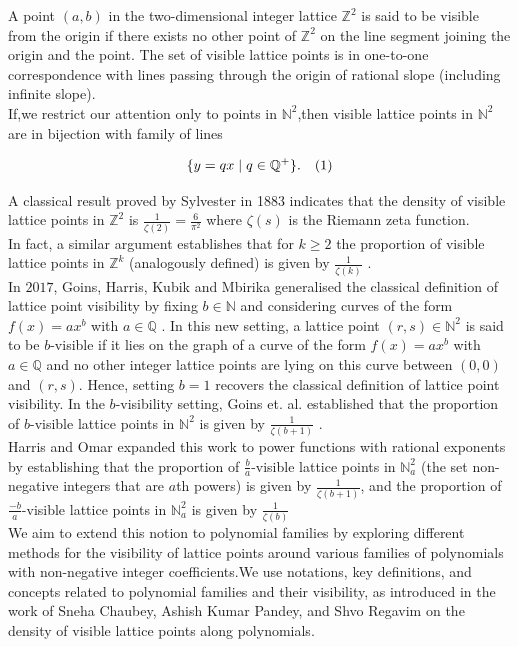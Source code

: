 \documentclass[12pt, reqno]{amsart}
\theoremstyle{definition}
\theoremstyle{remark}
\numberwithin{equation}{section}
\begin{document}
\noindent A point $(a, b)$ in the two-dimensional integer lattice $\mathbb{Z}^{2}$ is said to be visible from the origin if there exists no other point of $\mathbb{Z}^{2}$ on the line segment joining the origin and the point. The set of visible lattice points is in one-to-one correspondence with lines passing through the origin of rational slope (including infinite slope).\\
If,we restrict our attention only to points in $\mathbb{N}^{2}$,then
visible lattice points in $\mathbb{N}^{2}$ are in bijection with family of lines
\vspace{-0.7cm}
\begin{center}
$$\{y = qx \hspace{0.1cm} | \hspace{0.1cm} q \in \mathbb{Q}^{+}\}. \quad (1)$$
\end{center}
A classical result proved by Sylvester \cite{Sylvester} in 1883 indicates that the density of visible lattice points in $\mathbb{Z}^{2}$ is $\frac{1}{\zeta(2)} = \frac{6}{\pi^2}$ where $\zeta(s)$ is the Riemann zeta function.\\
In fact, a similar argument establishes that for $k \ge 2$  the proportion of visible lattice points in $\mathbb{Z}^{k}$ (analogously defined) is given by $\frac{1}{\zeta(k)}$ \cite{J.Christopher}.\\
\vspace{-0.021cm}
\noindent In $2017$, Goins, Harris, Kubik and Mbirika generalised the classical definition of lattice point visibility by fixing $b \in  \mathbb{N}$ and considering curves of the form $f(x) = ax^{b}$ with $a \in \mathbb{Q}$ \cite{Goins}. In this new setting, a lattice point $(r, s) \in \mathbb{N}^{2}$ is said to be $b$-visible if it lies on the graph of a curve of the form $f(x) = ax^{b}$ with $a \in \mathbb{Q}$ and no other integer lattice points are lying on this curve between $(0, 0)$ and $(r, s)$. Hence, setting $b = 1$ recovers the classical
definition of lattice point visibility. In the $b$-visibility setting, Goins et. al. established that the proportion of $b$-visible lattice points in $\mathbb{N}^2$
is given by $\frac{1}{\zeta(b+1)}$ .\\
\vspace{-0.021cm}
Harris and Omar\cite{P.E. Harris} expanded this work to power functions with rational exponents by establishing that the proportion of $\frac{b}{a}$-visible lattice points in $\mathbb{N}^2_{a}$ (the set non-negative integers that are  $a$th powers) is given
by $\frac{1}{\zeta(b+1 )}$, and the proportion of $\frac{-b}{a}$-visible lattice points in $\mathbb{N}^2_a$ is given by $\frac{1}{\zeta(b)}$ \\
\vspace{-0.018cm}
We aim to extend this notion to polynomial families by exploring different methods for the visibility of lattice points around various families of polynomials with non-negative integer coefficients.We use notations, key definitions, and concepts related to polynomial families and their visibility, as introduced in the work of Sneha Chaubey, Ashish Kumar Pandey, and Shvo Regavim \cite{Sneha} on the density of visible lattice points along polynomials.\\
\end{document}
